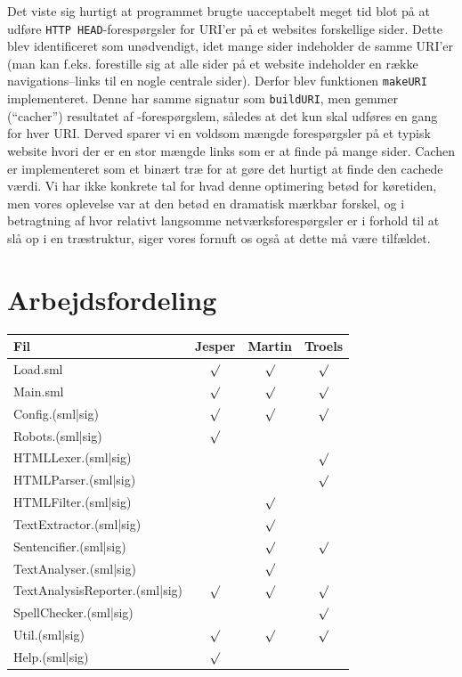 \documentclass[a4paper,oneside]{memoir}
\begin{document}
Det viste sig hurtigt at programmet brugte uacceptabelt meget tid blot
på at udføre \texttt{HTTP HEAD}-forespørgsler for URI'er på et
websites forskellige sider. Dette blev identificeret som unødvendigt,
idet mange sider indeholder de samme URI'er (man kan f.eks. forestille
sig at alle sider på et website indeholder en række navigations--links
til en nogle centrale sider). Derfor blev funktionen \texttt{makeURI}
implementeret. Denne har samme signatur som \texttt{buildURI}, men
gemmer (``cacher'') resultatet af -forespørgslem,
således at det kun skal udføres en gang for hver URI. Derved sparer vi
en voldsom mængde forespørgsler på et typisk website hvori der er en
stor mængde links som er at finde på mange sider. Cachen er
implementeret som et binært træ for at gøre det hurtigt at finde den
cachede værdi. Vi har ikke konkrete tal for hvad denne optimering
betød for køretiden, men vores oplevelse var at den betød en dramatisk
mærkbar forskel, og i betragtning af hvor relativt langsomme
netværksforespørgsler er i forhold til at slå op i en træstruktur,
siger vores fornuft os også at dette må være tilfældet.

\section{Arbejdsfordeling}

\begin{longtable}{l|c|c|c}
\textbf{Fil} &
\textbf{Jesper} &
\textbf{Martin} &
\textbf{Troels} \\ \hline
Load.sml & $\surd$ & $\surd$ & $\surd$ \\ \hline
Main.sml & $\surd$ & $\surd$ & $\surd$ \\ \hline
Config.(sml|sig) & $\surd$ & $\surd$ & $\surd$ \\ \hline
Robots.(sml|sig) & $\surd$ & & \\ \hline
HTMLLexer.(sml|sig) & & & $\surd$ \\ \hline
HTMLParser.(sml|sig) & & & $\surd$ \\ \hline
HTMLFilter.(sml|sig) & & $\surd$ & \\ \hline
TextExtractor.(sml|sig) & & $\surd$ & \\ \hline
Sentencifier.(sml|sig) & & $\surd$ & $\surd$ \\ \hline
TextAnalyser.(sml|sig) & & $\surd$ & \\ \hline
TextAnalysisReporter.(sml|sig) & $\surd$ & $\surd$ & $\surd$ \\ \hline
SpellChecker.(sml|sig) & & & $\surd$ \\ \hline
Util.(sml|sig) & $\surd$ & $\surd$ & $\surd$ \\ \hline
Help.(sml|sig) & $\surd$ & & \\ \hline
\end{longtable}
\end{document}
